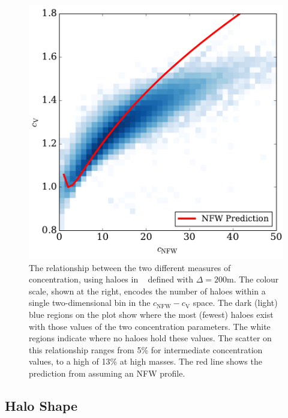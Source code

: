 \documentclass[usenatbib,fleqn]{mnras}
\begin{document}
\begin{figure}
\centering
\includegraphics[width=\columnwidth]{cvvscnfw_relation.pdf}
\caption{
The relationship between the two different measures of concentration, using haloes in \simB~ defined with $\Delta=200$m. The colour scale, shown at the right, encodes the number of haloes within a single two-dimensional bin in the $c_{\mathrm{NFW}}-c_{\mathrm{V}}$ space. The dark (light) blue regions on the plot show where the most (fewest) haloes exist with those values of the two concentration parameters. The white regions indicate where no haloes hold these values. The scatter on this relationship ranges from 5\% for intermediate concentration values, to a high of 13\% at high masses. The red line shows the prediction from  assuming an NFW profile.}
\label{fig:concentrations}
\end{figure}


\subsection{Halo Shape}
\end{document}
